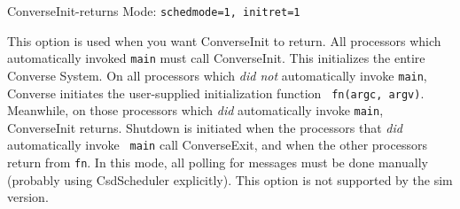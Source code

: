 ConverseInit-returns Mode: {\tt schedmode=1, initret=1}

This option is used when you want ConverseInit to return.  All
processors which automatically invoked {\tt main} must call
ConverseInit.  This initializes the entire Converse System.  On all
processors which {\em did not} automatically invoke {\tt main},
Converse initiates the user-supplied initialization function {\tt
fn(argc, argv)}.  Meanwhile, on those processors which {\em did}
automatically invoke {\tt main}, ConverseInit returns.  Shutdown is
initiated when the processors that {\em did} automatically invoke {\tt
main} call ConverseExit, and when the other processors return from
{\tt fn}.  In this mode, all polling for messages must be done
manually (probably using CsdScheduler explicitly).  This option is not
supported by the sim version.


